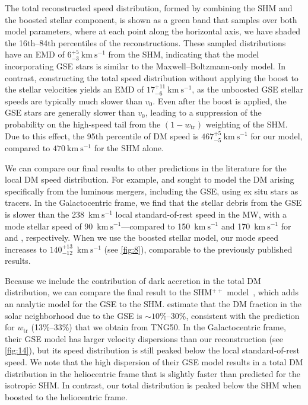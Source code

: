 \documentclass[twocolumn,tighten,twocolappendix]{aastex701}
\newcommand{\ftr}{\ensuremath{w_\mathrm{tr}}}
\newcommand{\kms}{\ensuremath{\text{km}~\text{s}^{-1}}}
\newcommand{\osim}{\mathord{\sim}}
\begin{document}
The total reconstructed speed distribution, formed by combining the SHM and the boosted stellar component, is shown as a green band that samples over both model parameters, where at each point along the horizontal axis, we have shaded the 16th--84th percentiles of the reconstructions. These sampled distributions have an EMD of $6^{+5}_{-3}~\kms{}$ from the SHM, indicating that the model incorporating GSE stars is similar to the Maxwell--Boltzmann-only model. In contrast, constructing the total speed distribution without applying the boost to the stellar velocities yields an EMD of $17^{+11}_{-6}~\kms{}$, as the unboosted GSE stellar speeds are typically much slower than $v_0$. Even after the boost is applied, the GSE stars are generally slower than $v_0$, leading to a suppression of the probability on the high-speed tail from the $(1-\ftr{})$ weighting of the SHM. Due to this effect, the 95th percentile of DM speed is $467^{+5}_{-5}~\kms{}$ for our model, compared to $470~\kms{}$ for the SHM alone.

We can compare our final results to other predictions in the literature for the local DM speed distribution.  For example, \citet{2019ApJ...883...27N} and \citet{2024ApJ...974..167Z} sought to model the DM arising specifically from the luminous mergers, including the GSE, using ex situ stars as tracers. In the Galactocentric frame, we find that the stellar debris from the GSE is slower than the 238~\kms{} local standard-of-rest speed in the MW, with a mode stellar speed of 90~\kms{}---compared to 150~\kms{} and 170~\kms{} for \citet{2019ApJ...883...27N} and \citet{2024ApJ...974..167Z}, respectively. When we use the boosted stellar model, our mode speed increases to $140_{-12}^{+13}$~\kms{} (see \autoref{fig:8}), comparable to the previously published results.

Because we include the contribution of dark accretion in the total DM distribution, we can compare the final result to the SHM$^{++}$ model~\citep{2019PhRvD..99b3012E}, which adds an analytic model for the GSE to the SHM. \cite{2019PhRvD..99b3012E} estimate that the DM fraction in the solar neighborhood due to the GSE is $\osim10\%$--30\%, consistent with the prediction for \ftr{} (13\%--33\%) that we obtain from TNG50. In the Galactocentric frame, their GSE model has larger velocity dispersions than our reconstruction (see \autoref{fig:14}), but its speed distribution is still peaked below the local standard-of-rest speed. We note that the high dispersion of their GSE model results in a total DM distribution in the heliocentric frame that is slightly faster than predicted for the isotropic SHM. In contrast, our total distribution is peaked below the SHM when boosted to the heliocentric frame.
\end{document}
